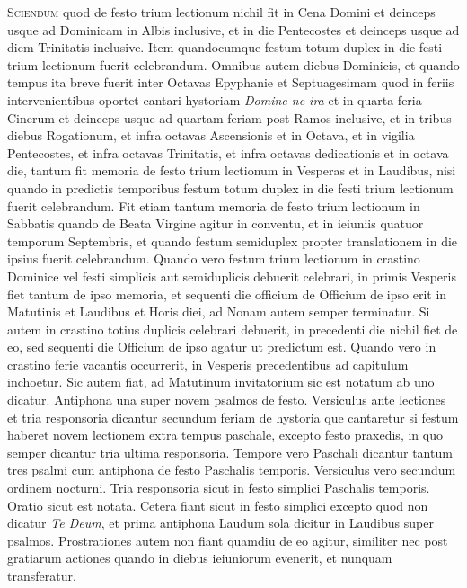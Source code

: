 \begin{multicols*}{2}
{\color{Red} }
\lettrine[lines=2]{\zallmancaps \color{Blue} S}{ciendum} quod de festo trium lectionum nichil fit in Cena Domini et deinceps usque ad Dominicam in Albis inclusive, et in die Pentecostes et deinceps usque ad diem Trinitatis inclusive.
Item quandocumque festum totum duplex in die festi trium lectionum fuerit celebrandum.
Omnibus autem diebus Dominicis, et quando tempus ita breve fuerit inter Octavas Epyphanie et Septuagesimam quod in feriis intervenientibus oportet cantari hystoriam \textit{Domine ne ira} et in quarta feria Cinerum et deinceps usque ad quartam feriam post Ramos inclusive, et in tribus diebus Rogationum, et infra octavas Ascensionis et in Octava, et in vigilia Pentecostes, et infra octavas Trinitatis, et infra octavas dedicationis et in octava die, tantum fit memoria de festo trium lectionum in Vesperas et in Laudibus, nisi quando in predictis temporibus festum totum duplex in die festi trium lectionum fuerit celebrandum.
Fit etiam tantum memoria de festo trium lectionum in Sabbatis quando de Beata Virgine agitur in conventu, et in ieiuniis quatuor temporum Septembris, et quando festum semiduplex propter translationem in die ipsius fuerit celebrandum.
Quando vero festum trium lectionum in crastino Dominice vel festi simplicis aut semiduplicis debuerit celebrari, in primis Vesperis fiet tantum de ipso memoria, et sequenti die officium de Officium de ipso erit in Matutinis et Laudibus et Horis diei, ad Nonam autem semper terminatur.
Si autem in crastino totius duplicis celebrari debuerit, in precedenti die nichil fiet de eo, sed sequenti die Officium de ipso agatur ut predictum est.
Quando vero in crastino ferie vacantis occurrerit, in Vesperis precedentibus ad capitulum inchoetur.
Sic autem fiat, ad Matutinum invitatorium sic est notatum ab uno dicatur. Antiphona una super novem psalmos de festo. Versiculus ante lectiones et tria responsoria dicantur secundum feriam de hystoria que cantaretur si festum haberet novem lectionem extra tempus paschale, excepto festo praxedis, in quo semper dicantur tria ultima responsoria. Tempore vero Paschali dicantur tantum tres psalmi cum antiphona de festo Paschalis temporis. Versiculus vero secundum ordinem nocturni. Tria responsoria sicut in festo simplici Paschalis temporis. Oratio sicut est notata. Cetera fiant sicut in festo simplici excepto quod non dicatur \textit{Te Deum}, et prima antiphona Laudum sola dicitur in Laudibus super psalmos. Prostrationes autem non fiant quamdiu de eo agitur, similiter nec post gratiarum actiones quando in diebus ieiuniorum evenerit, et nunquam transferatur.


\end{multicols*}
